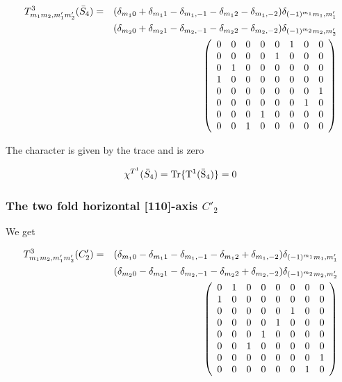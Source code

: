 \begin{eqnarray}\label{bS43}
T^3_{m_1m_2,m'_1m'_2}(\bar S_4)&=&
(\delta_{m_10}+\delta_{m_11}-\delta_{m_1,-1}-\delta_{m_12}-\delta_{m_1,-2})
\delta_{(-1)^{m_1}m_1,m'_1} \\ \nonumber
&&
(\delta_{m_20}+\delta_{m_21}-\delta_{m_2,-1}-\delta_{m_22}-\delta_{m_2,-2})
\delta_{(-1)^{m_2}m_2,m'_2} \\ \nonumber
&&\left (
\begin{array}{ccccccccc}
0 & 0 & 0 & 0 & 0 & 1 & 0 & 0\\
0 & 0 & 0 & 0 & 1 & 0 & 0 & 0\\
0 & 1 & 0 & 0 & 0 & 0 & 0 & 0\\
1 & 0 & 0 & 0 & 0 & 0 & 0 & 0\\ 
0 & 0 & 0 & 0 & 0 & 0 & 0 & 1\\ 
0 & 0 & 0 & 0 & 0 & 0 & 1 & 0\\ 
0 & 0 & 0 & 1 & 0 & 0 & 0 & 0\\ 
0 & 0 & 1 & 0 & 0 & 0 & 0 & 0\\ 
\end{array} \right )
\end{eqnarray}

The character is given by the trace and is zero

\begin{equation}
\chi^{T^1}(\bar S_4)=\rm Tr \{ T^1(\bar S_4) \}=0
\end{equation}


\subsubsection{The two fold horizontal [110]-axis  $C'_2$}


We get

\begin{eqnarray}\label{bCd23}
T^3_{m_1m_2,m'_1m'_2}(C'_2)&=&(\delta_{m_10}-\delta_{m_11}-\delta_{m_1,-1}-\delta_{m_12}+\delta_{m_1,-2})
\delta_{(-1)^{m_1}m_1,m'_1}\\ \nonumber
&&(\delta_{m_20}-\delta_{m_21}-\delta_{m_2,-1}-\delta_{m_22}+\delta_{m_2,-2})
\delta_{(-1)^{m_2}m_2,m'_2}\\ \nonumber
&&\left (
\begin{array}{ccccccccc}
0 & 1 & 0 & 0 & 0 & 0 & 0 & 0\\
1 & 0 & 0 & 0 & 0 & 0 & 0 & 0\\
0 & 0 & 0 & 0 & 0 & 1 & 0 & 0\\
0 & 0 & 0 & 0 & 1 & 0 & 0 & 0\\ 
0 & 0 & 0 & 1 & 0 & 0 & 0 & 0\\ 
0 & 0 & 1 & 0 & 0 & 0 & 0 & 0\\ 
0 & 0 & 0 & 0 & 0 & 0 & 0 & 1\\ 
0 & 0 & 0 & 0 & 0 & 0 & 1 & 0\\ 
\end{array} \right )
\end{eqnarray}

